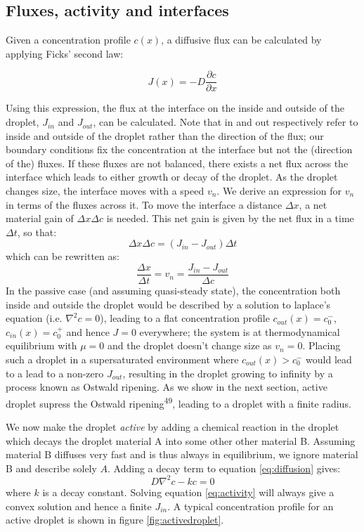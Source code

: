\documentclass{Dissertate}
\begin{document}
\hypertarget{fluxes-activity-and-interfaces}{%
\subsection{Fluxes, activity and
interfaces}\label{fluxes-activity-and-interfaces}}

Given a concentration profile \(c(x)\), a diffusive flux can be
calculated by applying Ficks' second law:

\[
J(x) = -D\frac{\partial c}{\partial x}
\]

Using this expression, the flux at the interface on the inside and
outside of the droplet, \(J_{in}\) and \(J_{out}\), can be calculated.
Note that in and out respectively refer to inside and outside of the
droplet rather than the direction of the flux; our boundary conditions
fix the concentration at the interface but not the (direction of the)
fluxes. If these fluxes are not balanced, there exists a net flux across
the interface which leads to either growth or decay of the droplet. As
the droplet changes size, the interface moves with a speed \(v_n\). We
derive an expression for \(v_n\) in terms of the fluxes across it. To
move the interface a distance \(\Delta x\), a net material gain of
\(\Delta x \Delta c\) is needed. This net gain is given by the net flux
in a time \(\Delta t\), so that: \[
\Delta x \Delta c = (J_{in}-J_{out})\Delta t
\] which can be rewritten as: \begin{equation}
\frac{\Delta x}{\Delta t} = v_n = \frac{J_{in}-J_{out}}{\Delta c}
\label{eq:interfacespeed}\end{equation} In the passive case (and
assuming quasi-steady state), the concentration both inside and outside
the droplet would be described by a solution to laplace's equation (i.e.
\(\nabla^2c=0\)), leading to a flat concentration profile
\(c_{out}(x)=c_0^-\), \(c_{in}(x)=c_0^+\) and hence \(J=0\) everywhere;
the system is at thermodynamical equilibrium with \(\mu=0\) and the
droplet doesn't change size as \(v_n=0\). Placing such a droplet in a
supersaturated environment where \(c_{out}(x)>c_0^-\) would lead to a
lead to a non-zero \(J_{out}\), resulting in the droplet growing to
infinity by a process known as Ostwald ripening. As we show in the next
section, active droplet supress the Ostwald
ripening\textsuperscript{49}, leading to a droplet with a finite radius.

We now make the droplet \emph{active} by adding a chemical reaction in
the droplet which decays the droplet material A into some other other
material B. Assuming material B diffuses very fast and is thus always in
equilibrium, we ignore material B and describe solely \(A\). Adding a
decay term to equation \ref{eq:diffusion} gives: \begin{equation}
D\nabla^2c-kc=0
\label{eq:activity}\end{equation} where \(k\) is a decay constant.
Solving equation \ref{eq:activity} will always give a convex
solution and hence a finite \(J_{in}\). A typical concentration profile
for an active droplet is shown in figure \ref{fig:activedroplet}.
\end{document}
